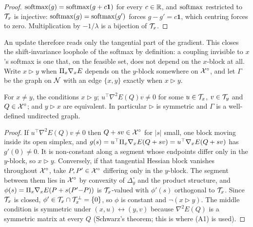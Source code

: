 \begin{proof}
$\operatorname{softmax}(g) = \operatorname{softmax}(g + c\mathbf{1})$ for every $c \in \mathbb{R}$, and $\operatorname{softmax}$ restricted to
$\mathcal{T}_{x}$ is injective: $\operatorname{softmax}(g) = \operatorname{softmax}(g')$ forces $g - g' = c\mathbf{1}$, which
centring forces to zero. Multiplication by $-1/\lambda$ is a bijection of $\mathcal{T}_{x}$.
\end{proof}

An update therefore reads only the tangential part of the gradient. This closes the
shift-invariance loophole of the softmax by definition: a coupling invisible to $x$'s softmax is
one that, on the feasible set, does not depend on the $x$-block at all. Write $x \rhd y$ when
$\Pi_{x}\nabla_x E$ depends on the $y$-block somewhere on $\mathcal{X}^{\circ}$, and let $\Gamma$ be the graph
on $\mathcal{N}$ with an edge $\{x,y\}$ exactly when $x \rhd y$.

\begin{lemma}
\label{app:lem-symmetry}
For $x \neq y$, the conditions $x \rhd y$; $u^{\top}\nabla^2 E(Q)v \neq 0$ for some
$u \in \mathcal{T}_{x}$, $v \in \mathcal{T}_{y}$ and $Q \in \mathcal{X}^{\circ}$; and $y \rhd x$ are equivalent. In
particular $\rhd$ is symmetric and $\Gamma$ is a well-defined undirected graph.
\end{lemma}

\begin{proof}
If $u^{\top}\nabla^2 E(Q)v \neq 0$ then $Q+sv \in \mathcal{X}^{\circ}$ for $|s|$ small, one block moving inside
its open simplex, and $g(s) = u^{\top}\Pi_{x}\nabla_x E(Q+sv) = u^{\top}\nabla_x E(Q+sv)$ has
$g'(0) \neq 0$. It is non-constant along a segment whose endpoints differ only in the $y$-block,
so $x \rhd y$. Conversely, if that tangential Hessian block vanishes throughout $\mathcal{X}^{\circ}$, take
$P,P' \in \mathcal{X}^{\circ}$ differing only in the $y$-block. The segment between them lies in $\mathcal{X}^{\circ}$ by
convexity of $\Delta^\circ_y$ and the product structure, and
$\phi(s) = \Pi_{x}\nabla_x E(P + s(P'{-}P))$ is $\mathcal{T}_{x}$-valued with $\phi'(s)$ orthogonal to
$\mathcal{T}_{x}$. Since $\mathcal{T}_{x}$ is closed, $\phi' \in \mathcal{T}_{x} \cap \mathcal{T}_{x}^{\perp} = \{0\}$, so
$\phi$ is constant and $\neg(x \rhd y)$. The middle condition is symmetric under
$(x,u) \leftrightarrow (y,v)$ because $\nabla^2 E(Q)$ is a symmetric matrix at every $Q$
(Schwarz's theorem; this is where (A1) is used).
\end{proof}

